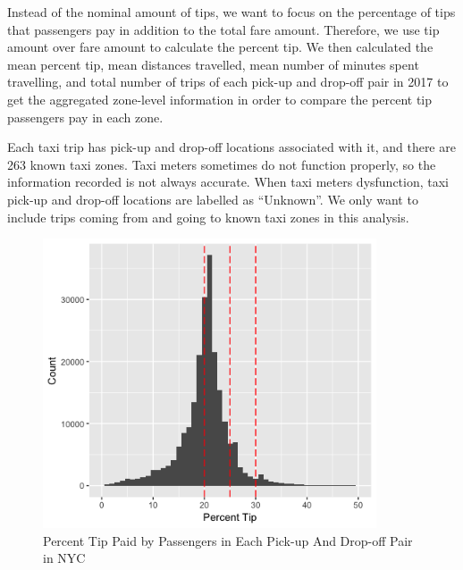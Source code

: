 \documentclass[12pt,twoside]{reedthesis}
\newenvironment{Shaded}{\begin{snugshade}}{\end{snugshade}}
\newcommand{\KeywordTok}[1]{\textcolor[rgb]{0.13,0.29,0.53}{\textbf{#1}}}
\newcommand{\DataTypeTok}[1]{\textcolor[rgb]{0.13,0.29,0.53}{#1}}
\newcommand{\DecValTok}[1]{\textcolor[rgb]{0.00,0.00,0.81}{#1}}
\newcommand{\StringTok}[1]{\textcolor[rgb]{0.31,0.60,0.02}{#1}}
\newcommand{\OperatorTok}[1]{\textcolor[rgb]{0.81,0.36,0.00}{\textbf{#1}}}
\newcommand{\NormalTok}[1]{#1}
\theoremstyle{definition}
\theoremstyle{definition}
\theoremstyle{definition}
\theoremstyle{remark}
\begin{document}
Instead of the nominal amount of tips, we want to focus on the
percentage of tips that passengers pay in addition to the total fare
amount. Therefore, we use tip amount over fare amount to calculate the
percent tip. We then calculated the mean percent tip, mean distances
travelled, mean number of minutes spent travelling, and total number of
trips of each pick-up and drop-off pair in 2017 to get the aggregated
zone-level information in order to compare the percent tip passengers
pay in each zone.
\begin{Shaded}
\end{Shaded}
Each taxi trip has pick-up and drop-off locations associated with it,
and there are 263 known taxi zones. Taxi meters sometimes do not
function properly, so the information recorded is not always accurate.
When taxi meters dysfunction, taxi pick-up and drop-off locations are
labelled as ``Unknown''. We only want to include trips coming from and
going to known taxi zones in this analysis.
\begin{figure}[h]

{\centering \includegraphics[width=3.89in]{figure/region_vis} 

}

\caption{Percent Tip Paid by Passengers in Each Pick-up And Drop-off Pair in NYC}\label{fig:region-vis}
\end{figure}
\end{document}
